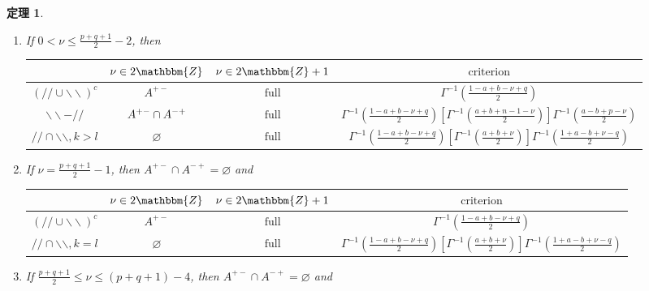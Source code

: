 \documentclass[12pt]{msjproc} %
\newcommand{\tmop}[1]{\ensuremath{\operatorname{#1}}}
\newtheorem{theorem}{定理}
\begin{document}
\begin{versiona}
\begin{theorem}
\begin{enumerate}
\begin{enumerate}
      \item If $0 < \nu \leqslant \frac{p + q + 1}{2} - 2$, then
      \begin{center}
        \begin{tabular}{|c|c|c|c|}
          \hline
          & $\nu \in 2\mathbbm{Z}$ & $\nu \in 2\mathbbm{Z}+ 1$ &
          $\tmop{criterion}$\\
          \hline
          $(/ / \cup \backslash\backslash)^c$ & $A^{+ -}$ & $\tmop{full}$ &
          $\Gamma^{- 1} \left( \frac{1 - a + b - \nu + q}{2} \right)$\\
          \hline
          $\backslash\backslash - / /$ & $A^{ + -} \cap A^{- +}$ &
          $\tmop{full}$ & $\Gamma^{- 1} \left( \frac{1 - a + b - \nu + q}{2}
          \right) \left[ \Gamma^{- 1} \left( \frac{a + b + n - 1 - \nu}{2}
          \right) \right] \Gamma^{- 1} \left( \frac{a - b + p - \nu}{2}
          \right)$\\
          \hline
          $/ / \cap \backslash\backslash, k > l$ & $\varnothing$ &
          $\tmop{full}$ & $\Gamma^{- 1} \left( \frac{1 - a + b - \nu + q}{2}
          \right) \left[ \Gamma^{- 1} \left( \frac{a + b + \nu}{2} \right)
          \right] \Gamma^{- 1} \left( \frac{1 + a - b + \nu - q}{2} \right)$\\
          \hline
        \end{tabular}
      \end{center}
      \item If $\nu = \frac{p + q + 1}{2} - 1$, then $A^{+ -} \cap A^{- +} =
      \varnothing$ and
      \begin{center}
        \begin{tabular}{|c|c|c|c|}
          \hline
          & $\nu \in 2\mathbbm{Z}$ & $\nu \in 2\mathbbm{Z}+ 1$ &
          $\tmop{criterion}$\\
          \hline
          $(/ / \cup \backslash\backslash)^c$ & $A^{+ -}$ & $\tmop{full}$ &
          $\Gamma^{- 1} \left( \frac{1 - a + b - \nu + q}{2} \right)$\\
          \hline
          $/ / \cap \backslash\backslash, k = l$ & $\varnothing$ &
          $\tmop{full}$ & $\Gamma^{- 1} \left( \frac{1 - a + b - \nu + q}{2}
          \right) \left[ \Gamma^{- 1} \left( \frac{a + b + \nu}{2} \right)
          \right] \Gamma^{- 1} \left( \frac{1 + a - b + \nu - q}{2} \right)$\\
          \hline
        \end{tabular}
      \end{center}
      \item If $\frac{p + q + 1}{2} \leqslant \nu \leqslant (p + q + 1) - 4$,
      then $A^{+ -} \cap A^{- +} = \varnothing$ and
      

\end{enumerate}
\end{enumerate}
\end{theorem}
\end{versiona}
\end{document}
